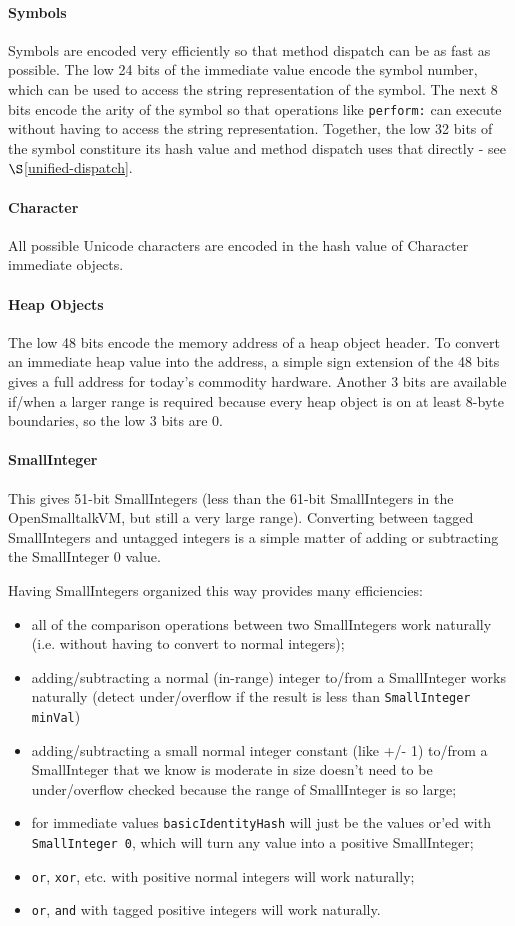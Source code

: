 \documentclass[
]{ceurart}
\def\secref{$\S$\ref}
\begin{document}
\paragraph{Symbols}
Symbols are encoded very efficiently so that method dispatch can be as fast as possible.
The low 24 bits of the immediate value encode the symbol number, which can be used to access the string representation of the symbol.
The next 8 bits encode the arity of the symbol so that operations like \verb|perform:| can execute without having to access the string representation.
Together, the low 32 bits of the symbol constiture its hash value and method dispatch uses that directly - see \secref{unified-dispatch}.
\paragraph{Character}
All possible Unicode characters are encoded in the hash value of Character immediate objects.
\paragraph{Heap Objects}
The low 48 bits encode the memory address of a heap object header.
To convert an immediate heap value into the address, a simple sign extension of the 48 bits gives a full address for today's commodity hardware.
Another  3 bits are available if/when a larger range is required because every heap object is on at least 8-byte boundaries, so the low 3 bits are 0.
\paragraph{SmallInteger}
This gives 51-bit SmallIntegers (less than the 61-bit SmallIntegers in the OpenSmalltalkVM, but still a very large range).
Converting between tagged SmallIntegers and untagged integers is a simple matter of adding or subtracting the SmallInteger 0 value.

Having SmallIntegers organized this way provides many efficiencies:
\begin{itemize}
\item all of the comparison operations between two SmallIntegers work naturally (i.e. without having to convert to normal integers);
\item adding/subtracting a normal (in-range) integer to/from a SmallInteger works naturally (detect under/overflow if the result is less than \verb|SmallInteger minVal|)
\item adding/subtracting a small normal integer constant (like +/- 1) to/from a SmallInteger that we know is moderate in size doesn't need to be under/overflow checked because the range of SmallInteger is so large;
\item for immediate values \verb|basicIdentityHash| will just be the values or'ed with \verb|SmallInteger 0|, which will turn any value into a positive SmallInteger;
\item \verb|or|, \verb|xor|, etc. with positive normal integers will work naturally;
\item \verb|or|, \verb|and| with tagged positive integers will work naturally.
\end{itemize}
\end{document}
